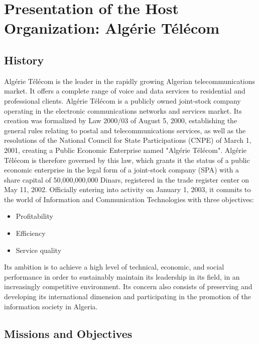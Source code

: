 \setcounter{chapter}{0}
\chapter{Presentation of the Host Organization: Algérie Télécom}
\label{chap:presentation}

\section{History}
\label{subsec:historique}

Algérie Télécom is the leader in the rapidly growing Algerian telecommunications market. It offers a complete range of voice and data services to residential and professional clients. Algérie Télécom is a publicly owned joint-stock company operating in the electronic communications networks and services market. Its creation was formalized by Law 2000/03 of August 5, 2000, establishing the general rules relating to postal and telecommunications services, as well as the resolutions of the National Council for State Participations (CNPE) of March 1, 2001, creating a Public Economic Enterprise named "Algérie Télécom". Algérie Télécom is therefore governed by this law, which grants it the status of a public economic enterprise in the legal form of a joint-stock company (SPA) with a share capital of 50,000,000,000 Dinars, registered in the trade register center on May 11, 2002. Officially entering into activity on January 1, 2003, it commits to the world of Information and Communication Technologies with three objectives:
\begin{itemize}
    \setlength{\itemsep}{4pt}
    \setlength{\parskip}{4pt}
    \setlength{\parsep}{4pt}
    \item Profitability
    \item Efficiency
    \item Service quality
\end{itemize}

Its ambition is to achieve a high level of technical, economic, and social performance in order to sustainably maintain its leadership in its field, in an increasingly competitive environment. Its concern also consists of preserving and developing its international dimension and participating in the promotion of the information society in Algeria.

\section{Missions and Objectives}
\label{subsec:missions}


